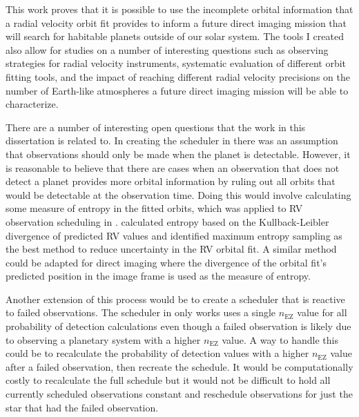This work proves that it is possible to use the incomplete orbital information
that a radial velocity orbit fit provides to inform a future direct imaging
mission that will search for habitable planets outside of our solar system. The
tools I created also allow for studies on a number of interesting questions
such as observing strategies for radial velocity instruments, systematic
evaluation of different orbit fitting tools, and the impact of reaching
different radial velocity precisions on the number of Earth-like atmospheres a
future direct imaging mission will be able to characterize.

There are a number of interesting open questions that the work in this
dissertation is related to. In creating the scheduler in
 there was an assumption that observations should
only be made when the planet is detectable. However, it is reasonable to
believe that there are cases when an observation that does not detect a planet
provides more orbital information by ruling out all orbits that would be
detectable at the observation time. Doing this would involve calculating some
measure of entropy in the fitted orbits, which was applied to RV observation
scheduling in \citet{loredoBayesianMethodsAnalysis2012}.
\citet{loredoBayesianMethodsAnalysis2012} calculated entropy based on the
Kullback-Leibler divergence of predicted RV values and identified maximum
entropy sampling as the best method to reduce uncertainty in the RV orbital
fit. A similar method could be adapted for direct imaging where the divergence
of the orbital fit's predicted position in the image frame is used as the
measure of entropy.

Another extension of this process would be to create a scheduler that is
reactive to failed observations. The scheduler in 
only works uses a single $n_\textrm{EZ}$ value for all probability of detection
calculations even though a failed observation is likely due to observing a
planetary system with a higher $n_\textrm{EZ}$ value. A way to handle this
could be to recalculate the probability of detection values with a higher
$n_\textrm{EZ}$ value after a failed observation, then recreate the schedule.
It would be computationally costly to recalculate the full schedule but it
would not be difficult to hold all currently scheduled observations constant
and reschedule observations for just the star that had the failed observation.

